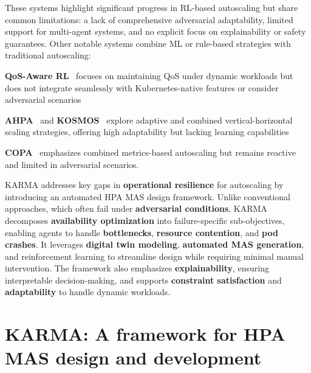 \documentclass[conference]{IEEEtran}
\begin{document}
These systems highlight significant progress in RL-based autoscaling but share common limitations: a lack of comprehensive adversarial adaptability, limited support for multi-agent systems, and no explicit focus on explainability or safety guarantees.
%
Other notable systems combine ML or rule-based strategies with traditional autoscaling:
%
\begin{enumerate*}[label={}, itemjoin={;\quad }]
    \item \textbf{QoS-Aware RL}~\cite{QoSRL} focuses on maintaining QoS under dynamic workloads but does not integrate seamlessly with Kubernetes-native features or consider adversarial scenarios
    \item \textbf{AHPA}~\cite{AHPA} and \textbf{KOSMOS}~\cite{KOSMOS} explore adaptive and combined vertical-horizontal scaling strategies, offering high adaptability but lacking learning capabilities
    \item \textbf{COPA}~\cite{COPA} emphasizes combined metrics-based autoscaling but remains reactive and limited in adversarial scenarios.
\end{enumerate*}

KARMA addresses key gaps in \textbf{operational resilience} for autoscaling by introducing an automated HPA MAS design framework. Unlike conventional approaches, which often fail under \textbf{adversarial conditions}, KARMA decomposes \textbf{availability optimization} into failure-specific sub-objectives, enabling agents to handle \textbf{bottlenecks}, \textbf{resource contention}, and \textbf{pod crashes}. It leverages \textbf{digital twin modeling}, \textbf{automated MAS generation}, and reinforcement learning to streamline design while requiring minimal manual intervention. The framework also emphasizes \textbf{explainability}, ensuring interpretable decision-making, and supports \textbf{constraint satisfaction} and \textbf{adaptability} to handle dynamic workloads.


\section{KARMA: A framework for HPA MAS design and development}
\label{sec:proposed_approach}
\end{document}
